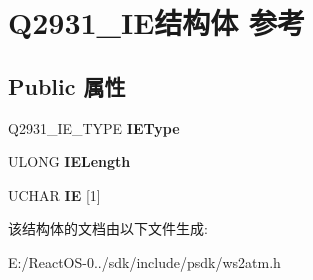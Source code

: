 \hypertarget{struct_q2931___i_e}{}\section{Q2931\+\_\+\+I\+E结构体 参考}
\label{struct_q2931___i_e}
\subsection*{Public 属性}
\begin{DoxyCompactItemize}
\item 
\mbox{\label{struct_q2931___i_e_a791b1debefd38f7c1b47cf8f9fff9435}} 
Q2931\+\_\+\+I\+E\+\_\+\+T\+Y\+PE {\bfseries I\+E\+Type}
\item 
\mbox{\label{struct_q2931___i_e_aba57395775ada07a8f2befc88df24199}} 
U\+L\+O\+NG {\bfseries I\+E\+Length}
\item 
\mbox{\label{struct_q2931___i_e_ae644a3c1e22b999784335d27dd068699}} 
U\+C\+H\+AR {\bfseries IE} \mbox{[}1\mbox{]}
\end{DoxyCompactItemize}


该结构体的文档由以下文件生成\+:\begin{DoxyCompactItemize}
\item 
E\+:/\+React\+O\+S-\/0../sdk/include/psdk/ws2atm.\+h\end{DoxyCompactItemize}
